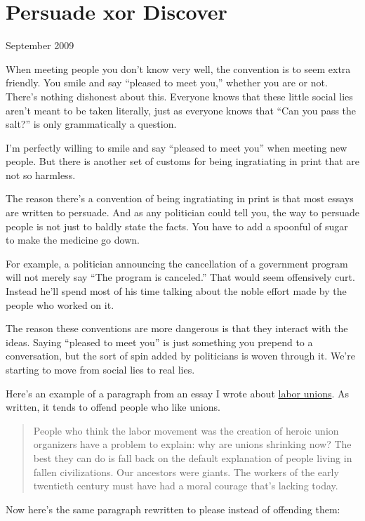 \chapter{Persuade xor Discover }

September 2009

When meeting people you don't know very well, the convention is to seem
extra friendly. You smile and say ``pleased to meet you,'' whether you
are or not. There's nothing dishonest about this. Everyone knows that
these little social lies aren't meant to be taken literally, just as
everyone knows that ``Can you pass the salt?'' is only grammatically a
question.

I'm perfectly willing to smile and say ``pleased to meet you'' when
meeting new people. But there is another set of customs for being
ingratiating in print that are not so harmless.

The reason there's a convention of being ingratiating in print is that
most essays are written to persuade. And as any politician could tell
you, the way to persuade people is not just to baldly state the facts.
You have to add a spoonful of sugar to make the medicine go down.

For example, a politician announcing the cancellation of a government
program will not merely say ``The program is canceled.'' That would seem
offensively curt. Instead he'll spend most of his time talking about the
noble effort made by the people who worked on it.

The reason these conventions are more dangerous is that they interact
with the ideas. Saying ``pleased to meet you'' is just something you
prepend to a conversation, but the sort of spin added by politicians is
woven through it. We're starting to move from social lies to real lies.

Here's an example of a paragraph from an essay I wrote about
\href{unions.html}{labor unions}. As written, it tends to offend people
who like unions.

\begin{quote}
People who think the labor movement was the creation of heroic union
organizers have a problem to explain: why are unions shrinking now? The
best they can do is fall back on the default explanation of people
living in fallen civilizations. Our ancestors were giants. The workers
of the early twentieth century must have had a moral courage that's
lacking today.
\end{quote}

Now here's the same paragraph rewritten to please instead of offending
them:

